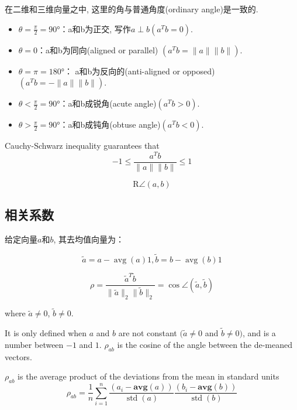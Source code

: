 在二维和三维向量之中, 这里的角与普通角度(ordinary angle)是一致的. 

\begin{itemize}
    \item $\theta =\frac{\pi}{2}=90°$：a和b为正交, 写作$a \perp b (a ^T b  =0)$. 
    \item $\theta =0$：a和b为同向(aligned or parallel) $(a ^T  b=\| a \| \| b  \| )$. 
    \item $\theta =\pi =180°$： a和b为反向的(anti-aligned or opposed)$(a ^T   b  = - \| a \| \| b \| )$. 
    \item $\theta <\frac{\pi}{2}=90°$：a和b成锐角(acute angle)$(a ^T b >0)$. 
    \item $\theta >\frac{\pi}{2}=90°$：a和b成钝角(obtuse angle)$(a ^T b <0)$. 
\end{itemize}

\begin{theorem}
    Cauchy-Schwarz inequality guarantees that
$$
-1 \leq \frac{a^{T} b}{\|a\|\|b\|} \leq 1
$$
\end{theorem}

\begin{definition}[球面的距离]
    $$  \mathrm{R} \angle(a, b) $$
\end{definition}

\subsection{相关系数}

给定向量$a$和$b$, 其去均值向量为：

$$ \tilde{a}=a-\operatorname{avg}(a) 1,  \tilde{b}=b-\operatorname{avg}(b) 1 $$

\begin{definition}[$a$和$b$的相关系数]
    $$ \rho=\frac{\tilde{a}^{T} \tilde{b}}{\|\tilde{a}\|_{2}\|\tilde{b}\|_{2}} = \cos \angle (\tilde{a}, \tilde{b}) $$

    where  $ \tilde{a} \neq 0 $,  $ \tilde{b} \neq 0 $.
\end{definition}

It is only defined when $ a $ and $ b $ are not constant $ (\tilde{a} \neq 0 $ and $ \tilde{b} \neq 0) $, and is a number between $ -1 $ and $1$. $ \rho_{a b} $ is the cosine of the angle between the de-meaned vectors.

\begin{theorem}
    $ \rho_{a b} $ is the average product of the deviations from the mean in standard units
$$
\rho_{a b}=\frac{1}{n} \sum_{i=1}^{n} \frac{\left(a_{i}-\mathbf{a v g}(a)\right)}{\operatorname{std}(a)} \frac{\left(b_{i}-\mathbf{a v g}(b)\right)}{\operatorname{std}(b)}
$$
\end{theorem}


